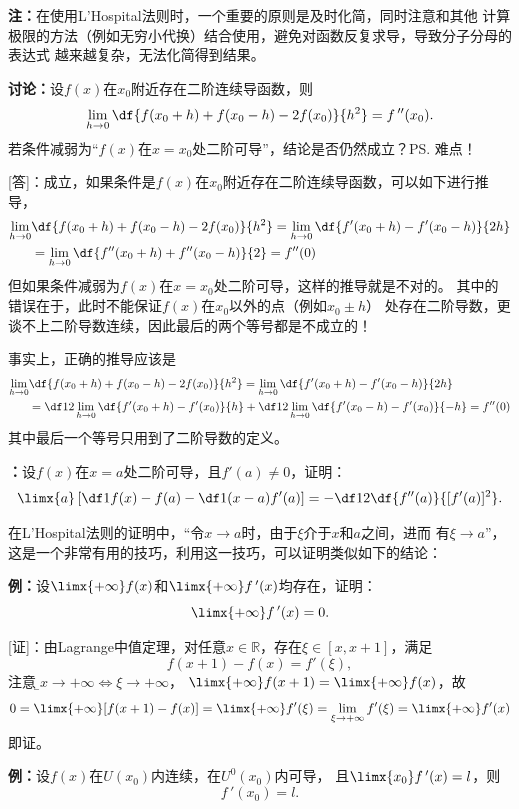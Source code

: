 {\bf 注：}在使用L'Hospital法则时，一个重要的原则是及时化简，同时注意和其他
计算极限的方法（例如无穷小代换）结合使用，避免对函数反复求导，导致分子分母的表达式
越来越复杂，无法化简得到结果。

{\b{\bf 讨论：}设$f(x)$在$x_0$附近存在二阶连续导函数，则
$$\lim\limits_{h\to 0}\df{f(x_0+h)+f(x_0-h)-2f(x_0)}{h^2}=f\,''(x_0).$$
若条件减弱为“$f(x)$在$x=x_0$处二阶可导”，结论是否仍然成立？\ps{难点！}

[答]：成立，如果条件是$f(x)$在$x_0$附近存在二阶连续导函数，可以如下进行推导，
\begin{align}
	\lim\limits_{h\to 0}&\df{f(x_0+h)+f(x_0-h)-2f(x_0)}{h^2}
	=\lim\limits_{h\to 0}\df{f'(x_0+h)-f'(x_0-h)}{2h}\notag\\
	&=\lim\limits_{h\to 0}\df{f''(x_0+h)+f''(x_0-h)}{2}
	=f''(0)\notag
\end{align}
但如果条件减弱为$f(x)$在$x=x_0$处二阶可导，这样的推导就是不对的。
其中的错误在于，此时不能保证$f(x)$在$x_0$以外的点（例如$x_0\pm h$）
处存在二阶导数，更谈不上二阶导数连续，因此最后的两个等号都是不成立的！

事实上，正确的推导应该是
\begin{align}
	\lim\limits_{h\to 0}&\df{f(x_0+h)+f(x_0-h)-2f(x_0)}{h^2}
	=\lim\limits_{h\to 0}\df{f'(x_0+h)-f'(x_0-h)}{2h}\notag\\
	&=\df12\lim\limits_{h\to 0}\df{f'(x_0+h)-f'(x_0)}{h}
	+\df12\lim\limits_{h\to 0}\df{f'(x_0-h)-f'(x_0)}{-h}
	=f''(0)\notag
\end{align}
其中最后一个等号只用到了二阶导数的定义。}

{\bf ：}设$f(x)$在$x=a$处二阶可导，且$f'(a)\ne0$，证明：
$$\limx{a}\left[\df1{f(x)-f(a)}-\df1{(x-a)f'(a)}\right]
=-\df12\df{f''(a)}{[f'(a)]^2}.$$

在L'Hospital法则的证明中，“令$x\to a$时，由于$\xi$介于$x$和$a$之间，进而
有$\xi\to a$”，这是一个非常有用的技巧，利用这一技巧，可以证明类似如下的结论：

{\bf 例：}设$\limx{+\infty}f(x)$和$\limx{+\infty}f\,'(x)$均存在，证明：
$$\limx{+\infty}f\,'(x)=0.$$

[证]：由Lagrange中值定理，对任意$x\in\mathbb{R}$，存在$\xi\in[x,x+1]$，满足
$$f(x+1)-f(x)=f'(\xi),$$
注意到{\b$x\to+\infty\Leftrightarrow\xi\to+\infty$}，
$\limx{+\infty}f(x+1)=\limx{+\infty}f(x)$，故
$$0=\limx{+\infty}[f(x+1)-f(x)]=\limx{+\infty}f'(\xi)
=\lim\limits_{\xi\to+\infty}f'(\xi)=\limx{+\infty}f'(x)$$
即证。

{\bf 例：}设$f(x)$在$U(x_0)$内连续，在$U^0(x_0)$内可导，
且$\limx{x_0}f\,'(x)=l$，则$$f\,'(x_0)=l.$$

